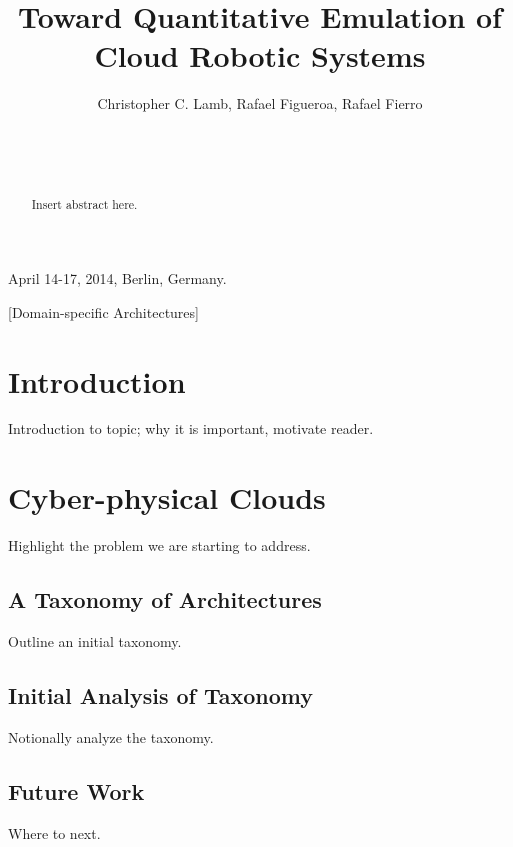 \documentclass{sig-alternate}
\begin{document}
\title{Toward Quantitative Emulation of Cloud Robotic Systems}


\author{
\alignauthor
Christopher C. Lamb, Rafael Figueroa, Rafael Fierro\\
       \\
       \\
       \\
}

 {April 14-17, 2014, Berlin, Germany.} 

\maketitle

\begin{abstract}
Insert abstract here.
\end{abstract}

[Domain-specific Architectures]

\section{Introduction}
Introduction to topic; why it is important, motivate reader.

\section{Cyber-physical Clouds}
Highlight the problem we are starting to address.

\subsection{A Taxonomy of Architectures}
Outline an initial taxonomy.

\subsection{Initial Analysis of Taxonomy}
Notionally analyze the taxonomy.

\subsection{Future Work}
Where to next.
\end{document}
